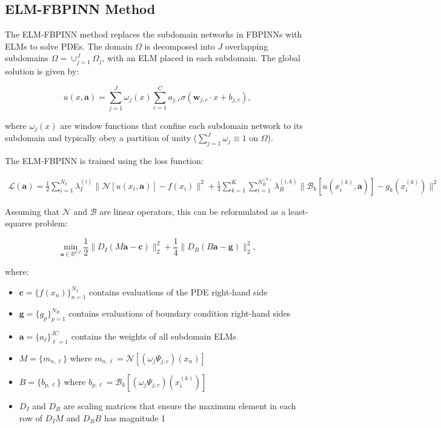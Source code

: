\documentclass[11pt]{article}
\begin{document}
\subsection{ELM-FBPINN Method}

The ELM-FBPINN method replaces the subdomain networks in FBPINNs with ELMs to solve PDEs. The domain $\Omega$ is decomposed into $J$ overlapping subdomains $\Omega = \cup_{j=1}^J \Omega_j$, with an ELM placed in each subdomain. The global solution is given by:

\begin{equation}
    u(x,\mathbf{a}) = \sum_{j=1}^{J} \omega_j(x) \sum_{c=1}^{C} a_{j,c} \sigma(\mathbf{w}_{j,c} \cdot x + b_{j,c}),
\end{equation}

where $\omega_j(x)$ are window functions that confine each subdomain network to its subdomain and typically obey a partition of unity ($\sum_{j=1}^{J} \omega_j \equiv 1$ on $\Omega$).

The ELM-FBPINN is trained using the loss function:

\begin{align}
    \mathcal{L}(\mathbf{a}) = \frac{1}{2} \sum_{i=1}^{N_I} \lambda_I^{(i)} \|\mathcal{N}[u(x_i,\mathbf{a})]-f(x_i)\|^2 + \frac{1}{4} \sum_{k=1}^{K} \sum_{i=1}^{N_B^{(k)}} \lambda_B^{(i,k)} \|\mathcal{B}_k[u(x_i^{(k)},\mathbf{a})]-g_k(x_i^{(k)})\|^2
\end{align}

Assuming that $\mathcal{N}$ and $\mathcal{B}$ are linear operators, this can be reformulated as a least-squares problem:

\begin{equation}
    \min_{\mathbf{a} \in \mathbb{R}^{CJ}} \frac{1}{2} \|D_I(M\mathbf{a}-\mathbf{c})\|_2^2 + \frac{1}{4} \|D_B(B\mathbf{a}-\mathbf{g})\|_2^2,
\end{equation}

where:
\begin{itemize}
    \item $\mathbf{c} = \{f(x_n)\}_{n=1}^{N_I}$ contains evaluations of the PDE right-hand side
    \item $\mathbf{g} = \{g_p\}_{p=1}^{N_B}$ contains evaluations of boundary condition right-hand sides
    \item $\mathbf{a} = \{a_\ell\}_{\ell=1}^{JC}$ contains the weights of all subdomain ELMs
    \item $M = \{m_{n,\ell}\}$ where $m_{n,\ell} = \mathcal{N}[(\omega_j\Psi_{j,c})(x_n)]$
    \item $B = \{b_{p,\ell}\}$ where $b_{p,\ell} = \mathcal{B}_k[(\omega_j\Psi_{j,c})(x_i^{(k)})]$
    \item $D_I$ and $D_B$ are scaling matrices that ensure the maximum element in each row of $D_I M$ and $D_B B$ has magnitude 1
\end{itemize}
\end{document}
